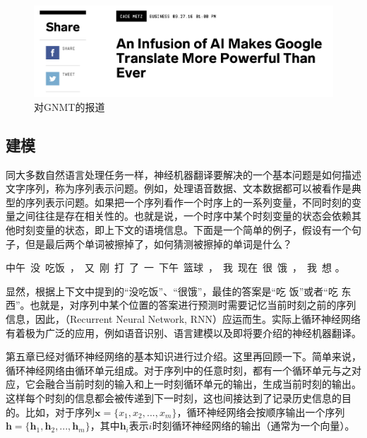 \begin{figure}[htp]
\centering
\includegraphics[scale=0.35]{./Chapter6/Figures/google-news.png}
\caption{对GNMT的报道}
\label{fig:6-8}
\end{figure}

\subsection{建模}
\label{sec:6.3.1}
\vspace{0.5em}

\parinterval 同大多数自然语言处理任务一样，神经机器翻译要解决的一个基本问题是如何描述文字序列，称为序列表示问题。例如，处理语音数据、文本数据都可以被看作是典型的序列表示问题。如果把一个序列看作一个时序上的一系列变量，不同时刻的变量之间往往是存在相关性的。也就是说，一个时序中某个时刻变量的状态会依赖其他时刻变量的状态，即上下文的语境信息。下面是一个简单的例子，假设有一个句子，但是最后两个单词被擦掉了，如何猜测被擦掉的单词是什么？

\vspace{0.8em}
\centerline{中午\ 没\ 吃饭\ ，\ 又\ 刚\ 打\ 了\ 一\ 下午\ 篮球\ ，\ 我\ 现在\ 很\ 饿\ ，\ 我\ 想\underline{\quad \quad \quad} 。}
\vspace{0.8em}

\parinterval 显然，根据上下文中提到的``没吃饭''、``很饿''，最佳的答案是``吃 饭''或者``吃 东西''。也就是，对序列中某个位置的答案进行预测时需要记忆当前时刻之前的序列信息，因此，{\small{}}（Recurrent Neural Network, RNN）应运而生。实际上循环神经网络有着极为广泛的应用，例如语音识别、语言建模以及即将要介绍的神经机器翻译。

\parinterval 第五章已经对循环神经网络的基本知识进行过介绍。这里再回顾一下。简单来说，循环神经网络由循环单元组成。对于序列中的任意时刻，都有一个循环单元与之对应，它会融合当前时刻的输入和上一时刻循环单元的输出，生成当前时刻的输出。这样每个时刻的信息都会被传递到下一时刻，这也间接达到了记录历史信息的目的。比如，对于序列$\mathbf{x}=\{x_1, x_2,..., x_m\}$，循环神经网络会按顺序输出一个序列$\mathbf{h}=\{ \mathbf{h}_1, \mathbf{h}_2,..., \mathbf{h}_m \}$，其中$\mathbf{h}_i$表示$i$时刻循环神经网络的输出（通常为一个向量）。

